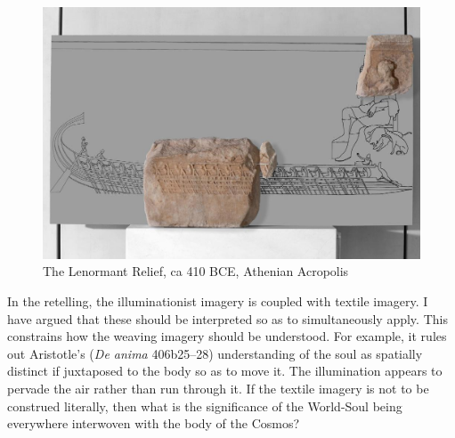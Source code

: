 \begin{figure}[htbp]
     \centering
         \includegraphics[scale=1.3]{graphics/trireme.jpg}
     \caption{The Lenormant Relief, ca 410 BCE, Athenian Acropolis}
     \label{fig:trireme}
\end{figure}

In the retelling, the illuminationist imagery is coupled with textile imagery. I have argued that these should be interpreted so as to simultaneously apply. This constrains how the weaving imagery should be understood. For example, it rules out Aristotle's (\emph{De anima} 406b25--28) understanding of the soul as spatially distinct if juxtaposed to the body so as to move it. The illumination appears to pervade the air rather than run through it. If the textile imagery is not to be construed literally, then what is the significance of the World-Soul being everywhere interwoven with the body of the Cosmos?

